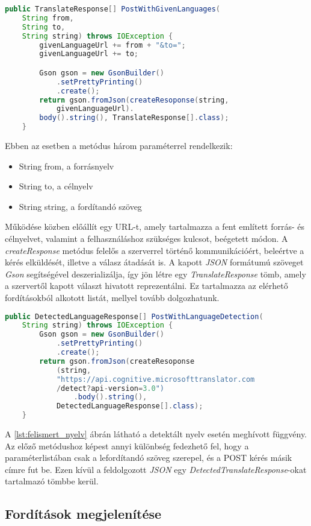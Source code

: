\begin{lstlisting}[caption=Függvény, amely kiválasztott nyelv esetén hívódik, language=java, label={lst:adott_nyelv}]
public TranslateResponse[] PostWithGivenLanguages(
    String from,
    String to,
    String string) throws IOException {
        givenLanguageUrl += from + "&to=";
        givenLanguageUrl += to;

        Gson gson = new GsonBuilder()
            .setPrettyPrinting()
            .create();
        return gson.fromJson(createResoponse(string,
            givenLanguageUrl).
        body().string(), TranslateResponse[].class);
    }
\end{lstlisting}
Ebben az esetben a metódus három paraméterrel rendelkezik:
\begin{itemize}[noitemsep]
\item String from, a forrásnyelv
\item String to, a célnyelv
\item String string, a fordítandó szöveg
\end{itemize}
Működése közben előállít egy URL-t, amely tartalmazza a fent említett forrás- és célnyelvet, valamint a felhasználáshoz szükséges kulcsot, beégetett módon. A \textit{createResponse} metódus felelős a szerverrel történő kommunikációért, beleértve a kérés elküldését, illetve a válasz átadását is. A kapott \textit{JSON} formátumú szöveget \textit{Gson} segítségével deszerializálja, így jön létre egy \textit{TranslateResponse} tömb, amely a szervertől kapott választ hivatott reprezentálni. Ez tartalmazza az elérhető fordításokból alkotott listát, mellyel tovább dolgozhatunk.

\begin{lstlisting}[caption=Függvény, amely detektált nyelv esetén hívódik, language=java, label={lst:felismert_nyelv}]
public DetectedLanguageResponse[] PostWithLanguageDetection(
    String string) throws IOException {
        Gson gson = new GsonBuilder()
            .setPrettyPrinting()
            .create();
        return gson.fromJson(createResoponse
            (string,
            "https://api.cognitive.microsofttranslator.com
            /detect?api-version=3.0")
                .body().string(),
            DetectedLanguageResponse[].class);
    }
\end{lstlisting}
A \ref{lst:felismert_nyelv} ábrán látható a detektált nyelv esetén meghívott függvény. Az előző metódushoz képest annyi különbség fedezhető fel, hogy a paraméterlistában csak a lefordítandó szöveg szerepel, és a POST kérés másik címre fut be. Ezen kívül a feldolgozott \textit{JSON} egy \textit{DetectedTranslateResponse}-okat tartalmazó tömbbe kerül. 

\subsection{Fordítások megjelenítése}

